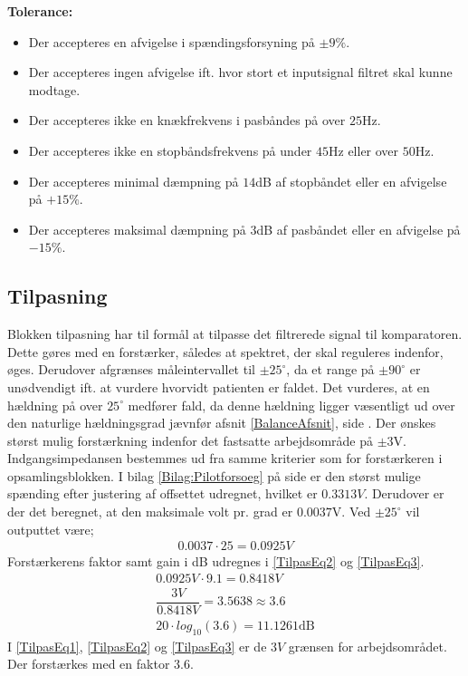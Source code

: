 \noindent \textbf{Tolerance:}
\begin{itemize}
	\item Der accepteres en afvigelse i spændingsforsyning på $\pm9\%$.
	\item Der accepteres ingen afvigelse ift. hvor stort et inputsignal filtret skal kunne modtage.
	\item Der accepteres ikke en knækfrekvens i pasbåndes på over $25$Hz.
	\item Der accepteres ikke en stopbåndsfrekvens på under $45$Hz eller over $50$Hz.
	\item Der accepteres minimal dæmpning på $14$dB af stopbåndet eller en afvigelse på $+15\%$.
	\item Der accepteres maksimal dæmpning på $3$dB af pasbåndet eller en afvigelse på $-15\%$.
\end{itemize}
\subsection{Tilpasning}\label{Tilpasningsblok}
Blokken tilpasning har til formål at tilpasse det filtrerede signal til komparatoren. Dette gøres med en forstærker, således at spektret, der skal reguleres indenfor, øges. Derudover afgrænses måleintervallet til $\pm25^{\circ}$, da et range på $\pm90^{\circ}$ er unødvendigt ift. at vurdere hvorvidt patienten er faldet. Det vurderes, at en hældning på over $25^{\circ}$ medfører fald, da denne hældning ligger væsentligt ud over den naturlige hældningsgrad jævnfør afsnit \ref{BalanceAfsnit}, side \pageref{BalanceAfsnit}. Der ønskes størst mulig forstærkning indenfor det fastsatte arbejdsområde på $\pm3$V. Indgangsimpedansen bestemmes ud fra samme kriterier som for forstærkeren i opsamlingsblokken. I bilag \ref{Bilag:Pilotforsoeg} på side \pageref{Bilag:Pilotforsoeg} er den størst mulige spænding efter justering af offsettet udregnet, hvilket er $0.3313V$. Derudover er der det beregnet, at den maksimale volt pr. grad er $0.0037$V. Ved $\pm25^{\circ}$ vil outputtet være;
\begin{align}
\label{Udreg3} 0.0037 \cdot 25 = 0.0925V
\end{align}
Forstærkerens faktor samt gain i dB udregnes i \eqref{TilpasEq2} og \eqref{TilpasEq3}.
\begin{align}
\label{TilpasEq1} 0.0925V \cdot 9.1 = 0.8418V \\
\label{TilpasEq2} \dfrac{3V}{0.8418V} = 3.5638 \approx 3.6 \\
\label{TilpasEq3} 20 \cdot log_{10} (3.6) = 11.1261\text{dB}
\end{align} 
I \eqref{TilpasEq1}, \eqref{TilpasEq2} og \eqref{TilpasEq3} er de $3V$ grænsen for arbejdsområdet. Der forstærkes med en faktor $3.6$. \\

